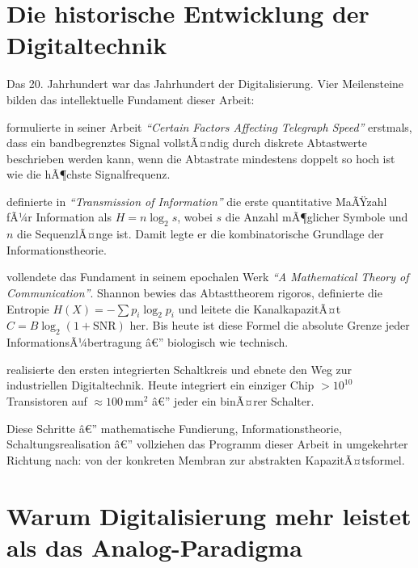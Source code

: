 ﻿\documentclass[12pt,a4paper,titlepage]{report}
\begin{document}
\section{Die historische Entwicklung der Digitaltechnik}

Das 20. Jahrhundert war das Jahrhundert der Digitalisierung.
Vier Meilensteine bilden das intellektuelle Fundament dieser Arbeit:

\begin{description}[leftmargin=3em, style=nextline]
	\item[1924 â€” Harry Nyquist]
		formulierte in seiner Arbeit \emph{``Certain Factors Affecting
		Telegraph Speed''} erstmals, dass ein bandbegrenztes Signal
		vollstÃ¤ndig durch diskrete Abtastwerte beschrieben werden kann,
		wenn die Abtastrate mindestens doppelt so hoch ist wie die
		hÃ¶chste Signalfrequenz.
	\item[1928 â€” Ralph Hartley]
		definierte in \emph{``Transmission of Information''} die erste
		quantitative MaÃŸzahl fÃ¼r Information als
		$H = n \log_2 s$,
		wobei $s$ die Anzahl mÃ¶glicher Symbole und $n$ die SequenzlÃ¤nge ist.
		Damit legte er die kombinatorische Grundlage der Informationstheorie.
	\item[1948 â€” Claude E. Shannon]
		vollendete das Fundament in seinem epochalen Werk
		\emph{``A Mathematical Theory of Communication''}.
		Shannon bewies das Abtasttheorem rigoros,
		definierte die Entropie
		$H(X) = -\sum p_i \log_2 p_i$
		und leitete die KanalkapazitÃ¤t
		$C = B \log_2(1 + \mathrm{SNR})$
		her.
		Bis heute ist diese Formel die absolute Grenze jeder
		InformationsÃ¼bertragung â€” biologisch wie technisch.
	\item[1958 â€” Jack Kilby]
		realisierte den ersten integrierten Schaltkreis und ebnete
		den Weg zur industriellen Digitaltechnik.
		Heute integriert ein einziger Chip $> 10^{10}$ Transistoren
		auf $\approx 100\,\mathrm{mm}^2$ â€”
		jeder ein binÃ¤rer Schalter.
\end{description}

Diese Schritte â€” mathematische Fundierung, Informationstheorie,
Schaltungsrealisation â€” vollziehen das Programm dieser Arbeit
in umgekehrter Richtung nach: von der konkreten Membran
zur abstrakten KapazitÃ¤tsformel.

\section{Warum Digitalisierung mehr leistet als das Analog-Paradigma}
\end{document}
